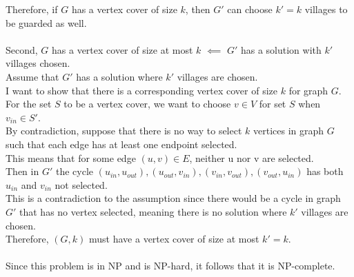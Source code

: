 \documentclass{article}
\begin{document}
\begin{enumerate}
    Therefore, if $G$ has a vertex cover of size $k$, then $G'$ can choose $k' = k$ villages to be guarded as well.\\
    \\
    Second, $G$ has a vertex cover of size at most $k$ $\impliedby$ $G'$ has a solution with $k'$ villages chosen.\\
    Assume that $G'$ has a solution where $k'$ villages are chosen.\\
    I want to show that there is a corresponding vertex cover of size $k$ for graph $G$.\\
    For the set $S$ to be a vertex cover, we want to choose $v \in V$ for set $S$ when $v_{in} \in S'$.\\
    By contradiction, suppose that there is no way to select $k$ vertices in graph $G$ such that each edge has at least one endpoint selected.\\
    This means that for some edge $(u,v) \in E$, neither u nor v are selected.\\
    Then in $G'$ the cycle $(u_{in}, u_{out}), (u_{out}, v_{in}), (v_{in}, v_{out}) ,(v_{out}, u_{in})$ has both $u_{in}$ and $v_{in}$ not selected.\\
    This is a contradiction to the assumption since there would be a cycle in graph $G'$ that has no vertex selected, meaning there is no solution where $k'$ villages are chosen.\\
    Therefore, $(G, k)$ must have a vertex cover of size at most $k' = k$.\\
    \\
    Since this problem is in NP and is NP-hard, it follows that it is NP-complete.\\
\end{enumerate}
\end{document}

